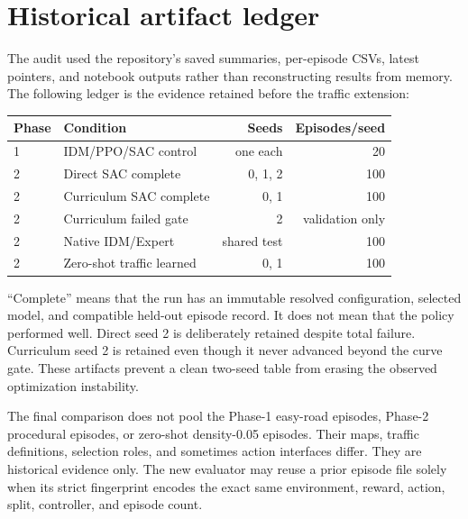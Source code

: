 \documentclass[10pt,twocolumn]{article}
\begin{document}
\section{Historical artifact ledger}
The audit used the repository's saved summaries, per-episode CSVs, latest pointers, and
notebook outputs rather than reconstructing results from memory. The following ledger is
the evidence retained before the traffic extension:
\begin{center}\scriptsize
\setlength{\tabcolsep}{3pt}
\begin{tabular}{llrr}
\toprule
Phase & Condition & Seeds & Episodes/seed \\
\midrule
1 & IDM/PPO/SAC control & one each & 20 \\
2 & Direct SAC complete & 0, 1, 2 & 100 \\
2 & Curriculum SAC complete & 0, 1 & 100 \\
2 & Curriculum failed gate & 2 & validation only \\
2 & Native IDM/Expert & shared test & 100 \\
2 & Zero-shot traffic learned & 0, 1 & 100 \\
\bottomrule
\end{tabular}
\end{center}
``Complete'' means that the run has an immutable resolved configuration, selected model,
and compatible held-out episode record. It does not mean that the policy performed well.
Direct seed 2 is deliberately retained despite total failure. Curriculum seed 2 is
retained even though it never advanced beyond the curve gate. These artifacts prevent a
clean two-seed table from erasing the observed optimization instability.

The final comparison does not pool the Phase-1 easy-road episodes, Phase-2 procedural
episodes, or zero-shot density-0.05 episodes. Their maps, traffic definitions, selection
roles, and sometimes action interfaces differ. They are historical evidence only. The
new evaluator may reuse a prior episode file solely when its strict fingerprint encodes
the exact same environment, reward, action, split, controller, and episode count.
\end{document}
